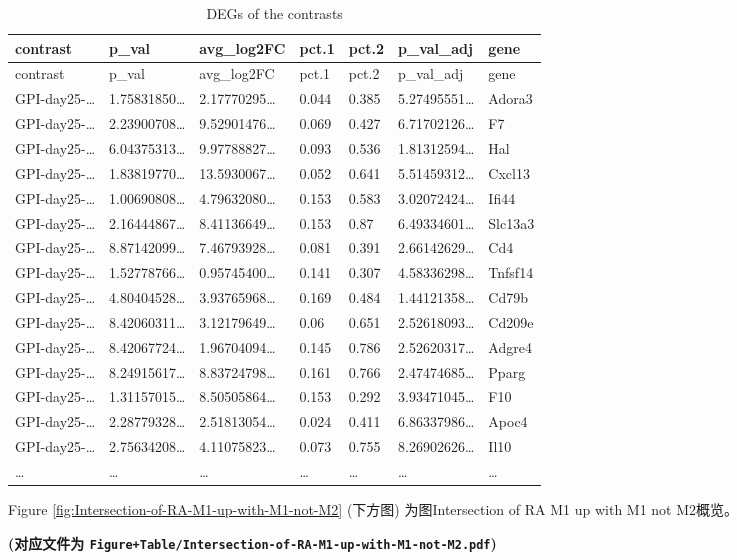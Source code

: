 \documentclass[
]{article}
\begin{document}
\begin{longtable}[]{@{}lllllll@{}}
\caption{\label{tab:DEGs-of-the-contrasts}DEGs of the contrasts}\tabularnewline
\toprule
contrast & p\_val & avg\_log2FC & pct.1 & pct.2 & p\_val\_adj & gene\tabularnewline
\midrule
\endfirsthead
\toprule
contrast & p\_val & avg\_log2FC & pct.1 & pct.2 & p\_val\_adj & gene\tabularnewline
\midrule
\endhead
GPI-day25-\ldots{} & 1.75831850\ldots{} & 2.17770295\ldots{} & 0.044 & 0.385 & 5.27495551\ldots{} & Adora3\tabularnewline
GPI-day25-\ldots{} & 2.23900708\ldots{} & 9.52901476\ldots{} & 0.069 & 0.427 & 6.71702126\ldots{} & F7\tabularnewline
GPI-day25-\ldots{} & 6.04375313\ldots{} & 9.97788827\ldots{} & 0.093 & 0.536 & 1.81312594\ldots{} & Hal\tabularnewline
GPI-day25-\ldots{} & 1.83819770\ldots{} & 13.5930067\ldots{} & 0.052 & 0.641 & 5.51459312\ldots{} & Cxcl13\tabularnewline
GPI-day25-\ldots{} & 1.00690808\ldots{} & 4.79632080\ldots{} & 0.153 & 0.583 & 3.02072424\ldots{} & Ifi44\tabularnewline
GPI-day25-\ldots{} & 2.16444867\ldots{} & 8.41136649\ldots{} & 0.153 & 0.87 & 6.49334601\ldots{} & Slc13a3\tabularnewline
GPI-day25-\ldots{} & 8.87142099\ldots{} & 7.46793928\ldots{} & 0.081 & 0.391 & 2.66142629\ldots{} & Cd4\tabularnewline
GPI-day25-\ldots{} & 1.52778766\ldots{} & 0.95745400\ldots{} & 0.141 & 0.307 & 4.58336298\ldots{} & Tnfsf14\tabularnewline
GPI-day25-\ldots{} & 4.80404528\ldots{} & 3.93765968\ldots{} & 0.169 & 0.484 & 1.44121358\ldots{} & Cd79b\tabularnewline
GPI-day25-\ldots{} & 8.42060311\ldots{} & 3.12179649\ldots{} & 0.06 & 0.651 & 2.52618093\ldots{} & Cd209e\tabularnewline
GPI-day25-\ldots{} & 8.42067724\ldots{} & 1.96704094\ldots{} & 0.145 & 0.786 & 2.52620317\ldots{} & Adgre4\tabularnewline
GPI-day25-\ldots{} & 8.24915617\ldots{} & 8.83724798\ldots{} & 0.161 & 0.766 & 2.47474685\ldots{} & Pparg\tabularnewline
GPI-day25-\ldots{} & 1.31157015\ldots{} & 8.50505864\ldots{} & 0.153 & 0.292 & 3.93471045\ldots{} & F10\tabularnewline
GPI-day25-\ldots{} & 2.28779328\ldots{} & 2.51813054\ldots{} & 0.024 & 0.411 & 6.86337986\ldots{} & Apoc4\tabularnewline
GPI-day25-\ldots{} & 2.75634208\ldots{} & 4.11075823\ldots{} & 0.073 & 0.755 & 8.26902626\ldots{} & Il10\tabularnewline
\ldots{} & \ldots{} & \ldots{} & \ldots{} & \ldots{} & \ldots{} & \ldots{}\tabularnewline
\bottomrule
\end{longtable}

Figure \ref{fig:Intersection-of-RA-M1-up-with-M1-not-M2} (下方图) 为图Intersection of RA M1 up with M1 not M2概览。

\textbf{(对应文件为 \texttt{Figure+Table/Intersection-of-RA-M1-up-with-M1-not-M2.pdf})}
\end{document}
